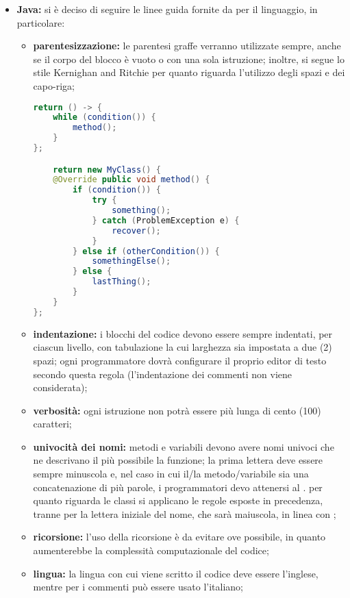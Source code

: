 					\begin{itemize}
						\item \textbf{Java:} si è deciso di seguire le linee guida fornite da  per il linguaggio, in particolare:
							\begin{itemize}
								\item \textbf{parentesizzazione:} le parentesi graffe verranno utilizzate sempre, anche se il corpo del blocco è vuoto o con una sola istruzione; inoltre, si segue lo stile Kernighan and Ritchie per quanto riguarda l'utilizzo degli spazi e dei capo-riga;
									\begin{lstlisting}[language=java,captionpos=b,caption={Esempio per la sintassi Java}]
return () -> {
	while (condition()) {
		method();
	}
};

	return new MyClass() {
	@Override public void method() {
		if (condition()) {
			try {
				something();
			} catch (ProblemException e) {
				recover();
			}
		} else if (otherCondition()) {
			somethingElse();
		} else {
			lastThing();
		}
	}
};
									\end{lstlisting}
								\item \textbf{indentazione:} i blocchi del codice devono essere sempre indentati, per ciascun livello, con tabulazione la cui larghezza sia impostata a due (2) spazi; ogni programmatore dovrà configurare il proprio editor di testo secondo questa regola (l'indentazione dei commenti non viene considerata);
								\item \textbf{verbosità:} ogni istruzione non potrà essere più lunga di cento (100) caratteri;
								\item \textbf{univocità dei nomi:} metodi e variabili devono avere nomi univoci che ne descrivano il più possibile la funzione; la prima lettera deve essere sempre minuscola e, nel caso in cui il/la metodo/variabile sia una concatenazione di più parole, i programmatori devo attenersi al . per quanto riguarda le classi si applicano le regole esposte in precedenza, tranne per la lettera iniziale del nome, che sarà maiuscola, in linea con ;
								\item \textbf{ricorsione:} l’uso della ricorsione è da evitare ove possibile, in quanto aumenterebbe la complessità computazionale del codice;
								\item \textbf{lingua:} la lingua con cui viene scritto il codice deve essere l’inglese, mentre per i commenti può essere usato l'italiano;


\end{itemize}
\end{itemize}
